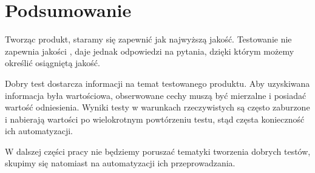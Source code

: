 \documentclass[00-praca-magisterska.tex]{subfiles}
\begin{document}
\section{Podsumowanie}
\label{testowanie-podsumowanie}

Tworząc produkt, staramy się zapewnić jak najwyższą jakość. Testowanie nie
zapewnia jakości \cite{good-test}, daje jednak odpowiedzi na pytania, dzięki
którym możemy określić osiągniętą jakość.

Dobry test dostarcza informacji na temat testowanego produktu. Aby uzyskiwana
informacja była wartościowa, obserwowane cechy muszą być mierzalne i posiadać
wartość odniesienia.  Wyniki testy w warunkach rzeczywistych są często
zaburzone i nabierają wartości po wielokrotnym powtórzeniu testu, stąd częsta
konieczność ich automatyzacji.

W dalszej części pracy nie będziemy poruszać tematyki tworzenia dobrych testów,
skupimy się natomiast na automatyzacji ich przeprowadzania.
\end{document}
